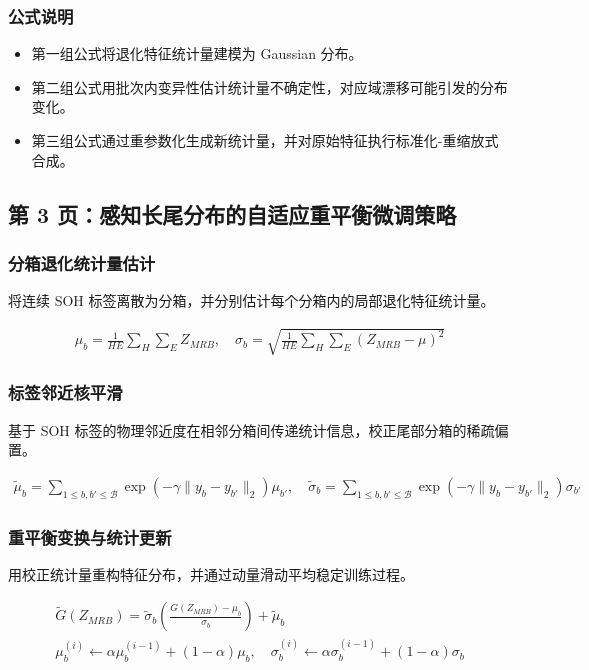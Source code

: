 ﻿\documentclass[UTF8,a4paper,10pt]{ctexart}
\begin{document}
\subsubsection*{公式说明}
\begin{itemize}
  \item 第一组公式将退化特征统计量建模为 Gaussian 分布。
  \item 第二组公式用批次内变异性估计统计量不确定性，对应域漂移可能引发的分布变化。
  \item 第三组公式通过重参数化生成新统计量，并对原始特征执行标准化-重缩放式合成。
\end{itemize}

\clearpage
\subsection{第 3 页：感知长尾分布的自适应重平衡微调策略}

\subsubsection*{分箱退化统计量估计}
将连续 SOH 标签离散为分箱，并分别估计每个分箱内的局部退化特征统计量。
\begin{formulabox}
\[\begin{gathered}
  \mu_b
  = \frac{1}{HE}\sum_H\sum_E Z_{MRB}, \quad
  \sigma_b
  = \sqrt{\frac{1}{HE}\sum_H\sum_E (Z_{MRB}-\mu)^2}
\end{gathered}\]
\end{formulabox}

\subsubsection*{标签邻近核平滑}
基于 SOH 标签的物理邻近度在相邻分箱间传递统计信息，校正尾部分箱的稀疏偏置。
\begin{formulabox}
\[\begin{gathered}
  \widetilde{\mu}_b
  = \sum_{1\leq b,b'\leq \mathcal{B}}
  \exp\left(-\gamma\lVert y_b-y_{b'}\rVert_2\right)\mu_{b'}, \quad
  \widetilde{\sigma}_b
  = \sum_{1\leq b,b'\leq \mathcal{B}}
  \exp\left(-\gamma\lVert y_b-y_{b'}\rVert_2\right)\sigma_{b'} 
\end{gathered}\]
\end{formulabox}

\subsubsection*{重平衡变换与统计更新}
用校正统计量重构特征分布，并通过动量滑动平均稳定训练过程。
\begin{formulabox}
\[\begin{gathered}
  \widetilde{G}(Z_{MRB})
  = \widetilde{\sigma}_b
  \left(\frac{G(Z_{MRB})-\mu_b}{\sigma_b}\right)
  +\widetilde{\mu}_b \\
  \mu_b^{(i)}
  \leftarrow \alpha\mu_b^{(i-1)}+(1-\alpha)\mu_b, \quad
  \sigma_b^{(i)}
  \leftarrow \alpha\sigma_b^{(i-1)}+(1-\alpha)\sigma_b 
\end{gathered}\]
\end{formulabox}
\end{document}
